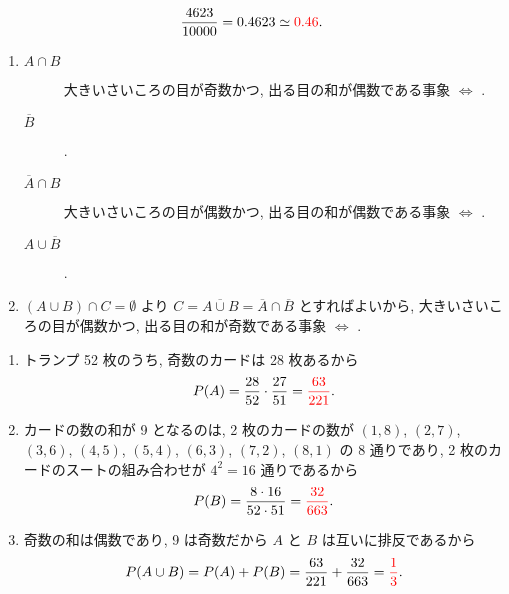 \begin{align}
	\frac{4623}{10000} = 0.4623 \simeq \textcolor{red}{0.46}.
\end{align}

\begin{enumerate}
	\item{
		\begin{description}
			\item[$A \cap B$]{
				大きいさいころの目が奇数かつ, 出る目の和が偶数である事象 $\Leftrightarrow$ .
			}
			\item[$\overline{B}$]{
				.
			}
			\item[$\overline{A} \cap B$]{
				大きいさいころの目が偶数かつ, 出る目の和が偶数である事象 $\Leftrightarrow$ .
			}
			\item[$A \cup \overline{B}$]{
				.
			}
		\end{description}
	}
	\item{
		$(A \cup B) \cap C = \emptyset$ より $C = \overline{A \cup B} = \overline{A} \cap \overline{B}$ とすればよいから, 大きいさいころの目が偶数かつ, 出る目の和が奇数である事象 $\Leftrightarrow$ .
	}
\end{enumerate}

\begin{enumerate}
	\item{
		トランプ 52 枚のうち, 奇数のカードは 28 枚あるから
		\begin{align}
			P(A) = \frac{28}{52}\cdot\frac{27}{51} = \textcolor{red}{\frac{63}{221}}.
		\end{align}
	}
	\item{
		カードの数の和が 9 となるのは, 2 枚のカードの数が $(1, 8)$, $(2, 7)$, $(3, 6)$, $(4, 5)$, $(5, 4)$, $(6, 3)$, $(7, 2)$, $(8, 1)$ の 8 通りであり, 2 枚のカードのスートの組み合わせが $4^{2} = 16$ 通りであるから
		\begin{align}
			P(B) = \frac{8\cdot16}{52\cdot51} = \textcolor{red}{\frac{32}{663}}.
		\end{align}
	}
	\item{
		奇数の和は偶数であり, 9 は奇数だから $A$ と $B$ は互いに排反であるから
		\begin{align}
			P(A\cup B) = P(A) + P(B) = \frac{63}{221} + \frac{32}{663} = \textcolor{red}{\frac{1}{3}}.
		\end{align}
	}
\end{enumerate}

